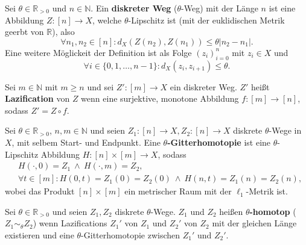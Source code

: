 \documentclass[12pt, aspectratio=169]{beamer}
\newcommand{\R}[0]{\mathbb{R}}
\newcommand{\N}[0]{\mathbb{N}}
\begin{document}
\begin{frame}
    \begin{definition} \label{def:discrete-path}
        Sei $\theta \in \R_{>0}$ und $n \in \N$. Ein \textbf{diskreter Weg} ($\theta$-Weg) mit der Länge $n$ ist eine Abbildung $Z: [n] \to X$,
        welche $\theta$-Lipschitz ist (mit der euklidischen Metrik geerbt von $\R$), also
        \begin{equation}
          \forall n_1, n_2 \in [n]\colon d_X(Z(n_2), Z(n_1)) \leq \theta |n_2 - n_1|.
        \end{equation}
        Eine weitere Möglickeit der Definition ist als Folge $(z_i)_{i=0}^n$ mit $z_i \in X$ und
        \begin{equation}
          \forall i \in \{0, 1, \ldots, n-1\} \colon d_X(z_i, z_{i+1}) \leq \theta.
        \end{equation}
      
        Sei $m \in \N$ mit $m \geq n$ und sei $Z'\colon [m] \to X$ ein diskreter Weg. $Z'$ heißt \textbf{Lazification} von $Z$ wenn eine surjektive, monotone Abbildung 
        $f\colon [m] \to [n]$, sodass $Z' = Z \circ f$. 
      \end{definition}
\end{frame}

\begin{frame}
    \begin{definition}
        Sei $\theta \in \R_{>0}$, $n,m \in \N$ und seien $Z_1\colon [n] \to X, Z_2: [n] \to X$ diskrete $\theta$-Wege in $X$, mit selbem Start- und Endpunkt.
        Eine \textbf{$\theta$-Gitterhomotopie} ist eine $\theta$-Lipschitz Abbildung $H\colon [n] \times [m] \to X$, sodass
        \begin{align*}
            &H(\cdot, 0) = Z_1 \: \land \: H(\cdot, m) = Z_2, \\
            &\forall t\in [m]\colon H(0,t) = Z_1(0) = Z_2(0) \: \land \: H(n,t) = Z_1(n) = Z_2(n),
        \end{align*}
        wobei das Produkt $[n] \times [m]$ ein metrischer Raum mit der $\ell_1$-Metrik ist.
    \end{definition}

    \begin{definition}
        Sei $\theta \in \R_{>0}$ und seien $Z_1, Z_2$ diskrete $\theta$-Wege. $Z_1$ und $Z_2$ heißen \textbf{$\theta$-homotop} ($Z_1 \sim_{\theta} Z_2$)
        wenn Lazifications $Z_1'$ von $Z_1$ und $Z_2'$ von $Z_2$ mit der gleichen Länge existieren und eine $\theta$-Gitterhomotopie zwischen $Z_1'$ und $Z_2'$.
    \end{definition}
\end{frame}
\end{document}
